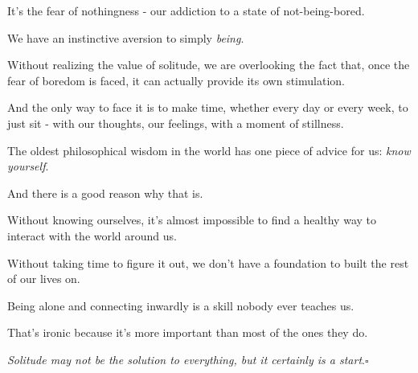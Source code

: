 \documentclass{book}
\numberwithin{equation}{section}
\begin{document}
It's the fear of nothingness - our addiction to a state of not-being-bored.

We have an instinctive aversion to simply \textit{being}.

%
Without realizing the value of solitude, we are overlooking the fact that, once the fear of boredom is faced, it can actually provide its own stimulation.

And the only way to face it is to make time, whether every day or every week, to just sit - with our thoughts, our feelings, with a moment of stillness.

%
The oldest philosophical wisdom in the world has one piece of advice for us: \textit{know yourself}.

And there is a good reason why that is.

%
Without knowing ourselves, it's almost impossible to find a healthy way to interact with the world around us.

Without taking time to figure it out, we don't have a foundation to built the rest of our lives on.

%
Being alone and connecting inwardly is a skill nobody ever teaches us.

That's ironic because it's more important than most of the ones they do.

%
\textit{Solitude may not be the solution to everything, but it certainly is a start}.\hfill$\square$





\printbibliography[heading=bibintoc]
\end{document}

